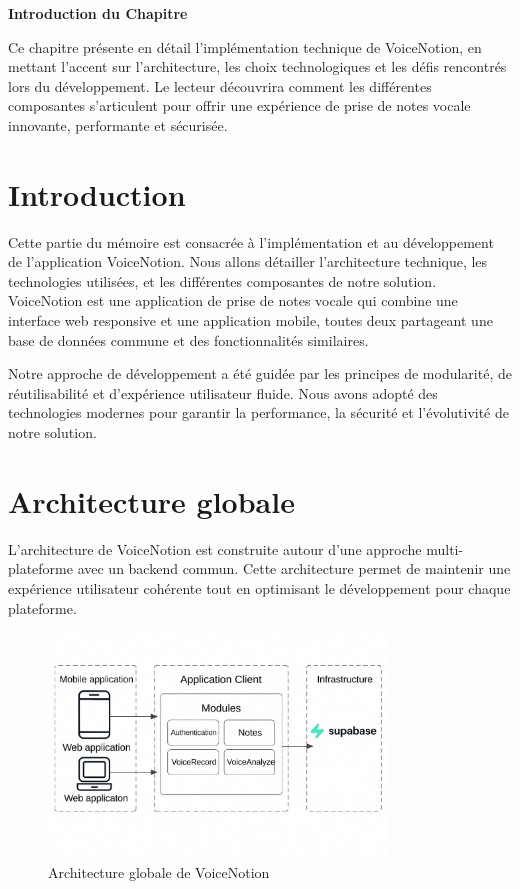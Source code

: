 
\begin{center}
\textbf{\large Introduction du Chapitre}
\end{center}

\noindent
Ce chapitre présente en détail l'implémentation technique de VoiceNotion, en mettant l'accent sur l'architecture, les choix technologiques et les défis rencontrés lors du développement. Le lecteur découvrira comment les différentes composantes s'articulent pour offrir une expérience de prise de notes vocale innovante, performante et sécurisée.

\section{Introduction}
Cette partie du mémoire est consacrée à l'implémentation et au développement de l'application VoiceNotion. Nous allons détailler l'architecture technique, les technologies utilisées, et les différentes composantes de notre solution. VoiceNotion est une application de prise de notes vocale qui combine une interface web responsive et une application mobile, toutes deux partageant une base de données commune et des fonctionnalités similaires.

Notre approche de développement a été guidée par les principes de modularité, de réutilisabilité et d'expérience utilisateur fluide. Nous avons adopté des technologies modernes pour garantir la performance, la sécurité et l'évolutivité de notre solution.

\section{Architecture globale}
L'architecture de VoiceNotion est construite autour d'une approche multi-plateforme avec un backend commun. Cette architecture permet de maintenir une expérience utilisateur cohérente tout en optimisant le développement pour chaque plateforme.

\begin{figure}[H]
    \centering
    \includegraphics[width=0.8\textwidth]{assets/docs/golobal-diagrams/global-architecture.jpg}
    \caption{Architecture globale de VoiceNotion}
    \label{fig:global-architecture}
\end{figure}

